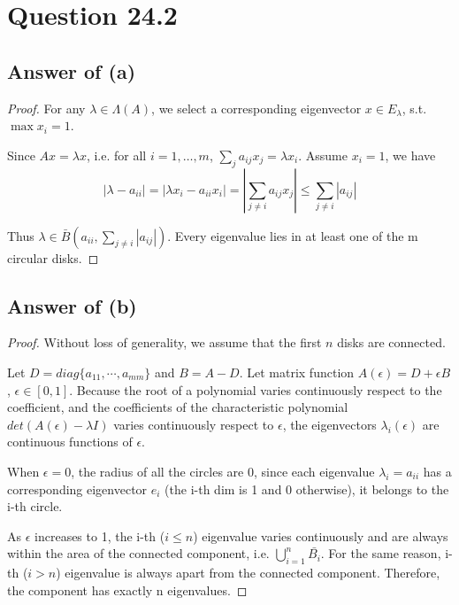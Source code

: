 \section*{Question 24.2}

\subsection*{Answer of (a)}
\begin{proof}
For any $\lambda\in \Lambda(A)$, we select a corresponding eigenvector $x\in E_{\lambda}$, s.t. $\max{x_i}=1$.

Since $Ax = \lambda x$, i.e. for all $i=1,\dots,m$, $\sum_{j} a_{ij}x_j = \lambda x_i$. Assume $x_i=1$, we have $$
|\lambda-a_{ii}|=|\lambda x_i-a_{ii}x_i| = |\sum_{j\neq i} a_{ij}x_j| \leq \sum_{j\neq i} |a_{ij}|
$$

Thus $\lambda\in \bar{B}(a_{ii}, \sum_{j\neq i} |a_{ij}|)$. Every eigenvalue lies in at least one of the m circular disks. 
\end{proof}


\subsection*{Answer of (b)}
\begin{proof}
Without loss of generality, we assume that the first $n$ disks are connected.

Let $D = diag\{a_{11},\cdots,a_{mm}\}$ and $B=A-D$. Let matrix function $A(\epsilon) = D+\epsilon B$, $\epsilon\in[0,1]$. Because the root of a polynomial varies continuously respect to the coefficient, and the coefficients of the characteristic polynomial $det(A(\epsilon)-\lambda I)$ varies continuously respect to $\epsilon$, the eigenvectors $\lambda_i(\epsilon)$ are continuous functions of $\epsilon$.

When $\epsilon=0$, the radius of all the circles are 0, since each eigenvalue $\lambda_i=a_{ii}$ has a corresponding eigenvector $e_i$ (the i-th dim is 1 and 0 otherwise), it belongs to the i-th circle.

As $\epsilon$ increases to 1, the i-th ($i\leq n$) eigenvalue varies continuously and are always within the area of the connected component, i.e. $\bigcup_{i=1}^n \bar{B_i}$. For the same reason, i-th ($i>n$) eigenvalue is always apart from the connected component. Therefore, the component has exactly n eigenvalues.
\end{proof}


